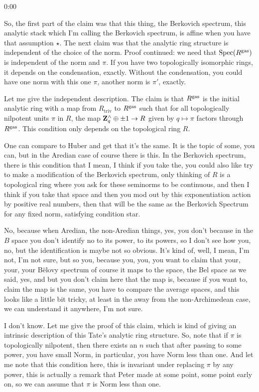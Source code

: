 \begin{unfinished}{0:00}
{%
So, the first part of the claim was that this thing, the Berkovich spectrum, this analytic stack which I'm calling the Berkovich spectrum, is affine when you have that assumption $\star$. The next claim was that the analytic ring structure is independent of the choice of the norm. Proof continued: we need that $\operatorname{Spec}(R^{\mathrm{gas}})$ is independent of the norm and $\pi$. If you have two topologically isomorphic rings, it depends on the condensation, exactly. Without the condensation, you could have one norm with this one $\pi$, another norm is $\pi'$, exactly.

Let me give the independent description. The claim is that $R^{\mathrm{gas}}$ is the initial analytic ring with a map from $R_{\text{triv}}$ to $R^{\mathrm{gas}}$ such that for all topologically nilpotent units $\pi$ in $R$, the map $\mathbf Z_q^\wedge \oplus \pm 1 \to R$ given by $q \mapsto \pi$ factors through $R^{\mathrm{gas}}$. This condition only depends on the topological ring $R$.

One can compare to Huber and get that it's the same. It is the topic of some, you can, but in the Aredian case of course there is this. In the Berkovich spectrum, there is this condition that I mean, I think if you take the, you could also like try to make a modification of the Berkovich spectrum, only thinking of $R$ is a topological ring where you ask for these seminorms to be continuous, and then I think if you take that space and then you mod out by this exponentiation action by positive real numbers, then that will be the same as the Berkovich Spectrum for any fixed norm, satisfying condition star.

No, because when Aredian, the non-Aredian things, yes, you don't because in the $B$ space you don't identify no to its power, to its powers, so I don't see how you, no, but the identification is maybe not so obvious. It's kind of, well, I mean, I'm not, I'm not sure, but so you, because you, you, you want to claim that your, your, your Bëlovy spectrum of course it maps to the space, the Bel space as we said, yes, and but you don't claim here that the map is, because if you want to, claim the map is the same, you have to compare the average spaces, and this looks like a little bit tricky, at least in the away from the non-Archimedean case, we can understand it anywhere, I'm not sure.

I don't know. Let me give the proof of this claim, which is kind of giving an intrinsic description of this Tate's analytic ring structure. So, note that if $\pi$ is topologically nilpotent, then there exists an $n$ such that after passing to some power, you have small Norm, in particular, you have Norm less than one. And let me note that this condition here, this is invariant under replacing $\pi$ by any power, this is actually a remark that Peter made at some point, some point early on, so we can assume that $\pi$ is Norm less than one.

}
\end{unfinished}
